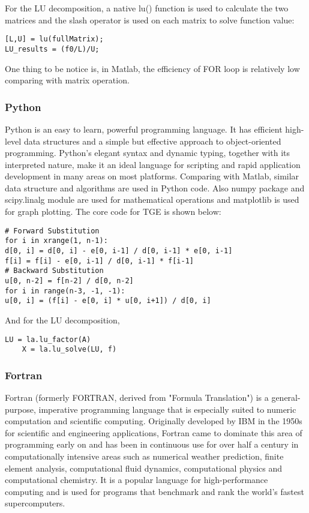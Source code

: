 \documentclass{article}
\begin{document}
  For the LU decomposition, a native lu() function is used to calculate the two matrices and the slash operator is used on each matrix to solve function value:\\
  \begin{lstlisting}[frame=single]  
[L,U] = lu(fullMatrix);
LU_results = (f0/L)/U;
  \end{lstlisting}  
  One thing to be notice is, in Matlab, the efficiency of FOR loop is relatively low comparing with matrix operation.
\subsubsection{Python}
Python is an easy to learn, powerful programming language. It has efficient high-level data structures and a simple but effective approach to object-oriented programming. Python’s elegant syntax and dynamic typing, together with its interpreted nature, make it an ideal language for scripting and rapid application development in many areas on most platforms.
Comparing with Matlab, similar data structure and algorithms are used in Python code. Also numpy package and scipy.linalg module are used for mathematical operations and matplotlib is used for graph plotting. The core code for TGE is shown below:
  \begin{lstlisting}[frame=single]  
# Forward Substitution
for i in xrange(1, n-1):
d[0, i] = d[0, i] - e[0, i-1] / d[0, i-1] * e[0, i-1]
f[i] = f[i] - e[0, i-1] / d[0, i-1] * f[i-1]
# Backward Substitution
u[0, n-2] = f[n-2] / d[0, n-2]
for i in range(n-3, -1, -1):
u[0, i] = (f[i] - e[0, i] * u[0, i+1]) / d[0, i]
  \end{lstlisting}  
  And for the LU decomposition, 
    \begin{lstlisting}[frame=single]  
    LU = la.lu_factor(A)
    X = la.lu_solve(LU, f)
    \end{lstlisting} 
\subsubsection{Fortran}
Fortran (formerly FORTRAN, derived from "Formula Translation") is a general-purpose, imperative programming language that is especially suited to numeric computation and scientific computing. Originally developed by IBM in the 1950s for scientific and engineering applications, Fortran came to dominate this area of programming early on and has been in continuous use for over half a century in computationally intensive areas such as numerical weather prediction, finite element analysis, computational fluid dynamics, computational physics and computational chemistry. It is a popular language for high-performance computing and is used for programs that benchmark and rank the world's fastest supercomputers.
\end{document}
